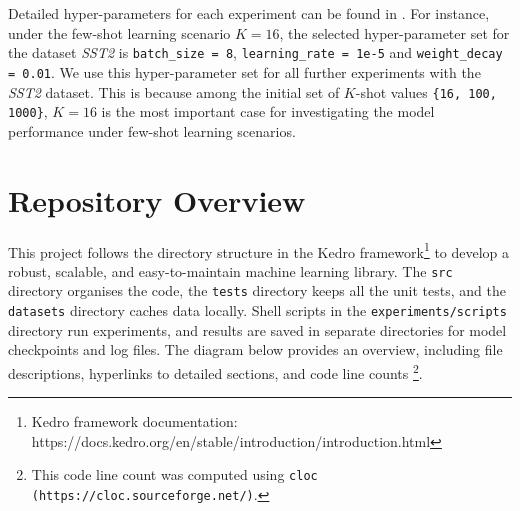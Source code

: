 Detailed hyper-parameters for each experiment can be found in . For instance, under the few-shot learning scenario $K = 16$, the selected hyper-parameter set for the dataset \textit{SST2} is \texttt{batch\_size = 8}, \texttt{learning\_rate = 1e-5} and \texttt{weight\_decay = 0.01}. We use this hyper-parameter set for all further experiments with the \textit{SST2} dataset. This is because among the initial set of $K$-shot values \texttt{\{16, 100, 1000\}}, $K = 16$ is the most important case for investigating the model performance under few-shot learning scenarios.

\section{Repository Overview} 
This project follows the directory structure in the Kedro framework\footnote{Kedro framework documentation: https://docs.kedro.org/en/stable/introduction/introduction.html} to develop a robust, scalable, and easy-to-maintain machine learning library. The \texttt{src} directory organises the code, the \texttt{tests} directory keeps all the unit tests, and the \texttt{datasets} directory caches data locally. Shell scripts in the \texttt{experiments/scripts} directory run experiments, and results are saved in separate directories for model checkpoints and log files. The diagram below provides an overview, including file descriptions, hyperlinks to detailed sections, and code line counts \footnote{{This code line count was computed using \texttt{cloc (https://cloc.sourceforge.net/)}.}}.

